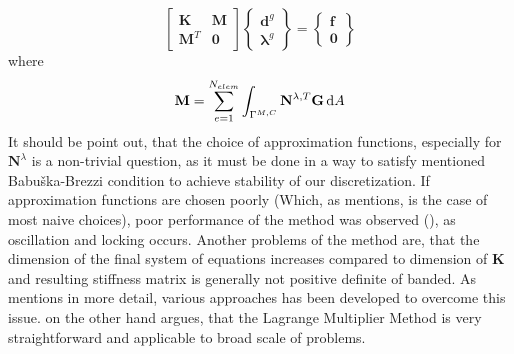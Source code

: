 \documentclass{article}
\newcommand{\dd}{\,{\rm d}}
\begin{document}
\begin{equation}\label{49}
\left[\begin{array}{ll}{\mathbf{K}} & {\mathbf{M}} \\ {\mathbf{M}^{T}} & {\mathbf{0}}\end{array}\right]\left\{\begin{array}{l}{\mathbf{d}^{g}} \\ {\bm{\lambda}^{g}}\end{array}\right\}=\left\{\begin{array}{l}{\mathbf{f}} \\ {\mathbf{0}}\end{array}\right\}
\end{equation} 
where
\begin{equation}\label{50}
\mathbf{M}=\sum^{N_{elem}}_{e = 1}\int_{\Gamma^{M,C}} \mathbf{N}^{\lambda,T} \mathbf{G} \dd A
\end{equation}  
It should be point out, that the choice of approximation functions, especially for $ \mathbf{N}^{\lambda} $ is a non-trivial question, as it must be done in a way to satisfy mentioned Babuška-Brezzi condition to achieve stability of our discretization.  
If approximation functions are chosen poorly (Which, as \cite{Augarde} mentions, is the case of most naive choices), poor performance of the method was observed (\cite{Augarde}), as oscillation and locking occurs. Another problems of the method are, that the dimension of the final system of equations increases compared to dimension of $ \mathbf{K} $ and resulting stiffness matrix is generally not positive definite of banded. As \cite{Augarde} mentions in more detail, various approaches has been developed to overcome this issue. \cite{Augarde} on the other hand argues, that the Lagrange Multiplier Method is very straightforward and applicable to broad scale of problems.   
\end{document}
